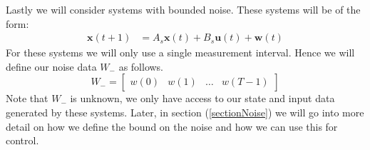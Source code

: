 Lastly we will consider systems with bounded noise. These systems will be of the form:
\begin{align} \label{isnSystem}
	\mathbf{x}(t+1) &= A_s \mathbf{x}(t) + B_s \mathbf{u}(t) + \mathbf{w}(t)
\end{align}
For these systems we will only use a single measurement interval. Hence we will define our noise data $W_-$ as follows. 
\[ W_- = \begin{bmatrix} w(0) & w(1) & \dots & w(T-1)	\end{bmatrix} \]
Note that $W_-$ is unknown, we only have access to our state and input data generated by these systems. Later, in section (\ref{sectionNoise}) we will go into more detail on how we define the bound on the noise and how we can use this for control.









